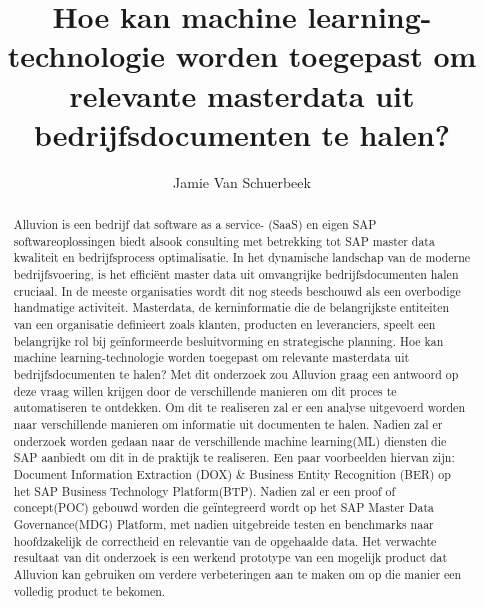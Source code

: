 \documentclass{hogent-article}
\title{Hoe kan machine learning-technologie worden toegepast om relevante masterdata uit bedrijfsdocumenten te halen?}
\author{Jamie Van Schuerbeek}
\begin{document}
\begin{abstract}

Alluvion is een bedrijf dat software as a service- (SaaS) en eigen SAP softwareoplossingen biedt alsook consulting met betrekking tot SAP master data kwaliteit en bedrijfsprocess optimalisatie. In het dynamische landschap van de moderne bedrijfsvoering, is het efficiënt master data uit omvangrijke bedrijfsdocumenten halen cruciaal. In de meeste organisaties wordt dit nog steeds beschouwd als een overbodige handmatige activiteit. Masterdata, de kerninformatie die de belangrijkste entiteiten van een organisatie definieert zoals klanten, producten en leveranciers, speelt een belangrijke rol bij geïnformeerde besluitvorming en strategische planning. Hoe kan machine learning-technologie worden toegepast om relevante masterdata uit bedrijfsdocumenten te halen? Met dit onderzoek zou Alluvion graag een antwoord op deze vraag willen krijgen door de verschillende manieren om dit proces te automatiseren te ontdekken. Om dit te realiseren zal er een analyse uitgevoerd worden naar verschillende manieren om informatie uit documenten te halen. Nadien zal er onderzoek worden gedaan naar de verschillende machine learning(ML) diensten die SAP aanbiedt om dit in de praktijk te realiseren. Een paar voorbeelden hiervan zijn: Document Information Extraction (DOX) \& Business Entity Recognition (BER) op het SAP Business Technology Platform(BTP). Nadien zal er een proof of concept(POC) gebouwd worden die geïntegreerd wordt op het SAP Master Data Governance(MDG) Platform, met nadien uitgebreide testen en benchmarks naar hoofdzakelijk de correctheid en relevantie van de opgehaalde data. Het verwachte resultaat van dit onderzoek is een werkend prototype van een mogelijk product dat Alluvion kan gebruiken om verdere verbeteringen aan te maken om op die manier een volledig product te bekomen.

\end{abstract}

\tableofcontents



\printbibliography[heading=bibintoc]
\end{document}
